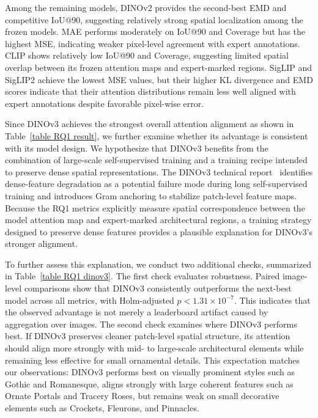 \documentclass[lineno,pdflatex,sn-mathphys-num]{sn-jnl}%
\theoremstyle{thmstyleone}%
\theoremstyle{thmstyletwo}%
\theoremstyle{thmstylethree}%
\begin{document}
Among the remaining models, DINOv2 provides the second-best EMD and competitive IoU@90, suggesting relatively strong spatial localization among the frozen models. MAE performs moderately on IoU@90 and Coverage but has the highest MSE, indicating weaker pixel-level agreement with expert annotations. CLIP shows relatively low IoU@90 and Coverage, suggesting limited spatial overlap between its frozen attention maps and expert-marked regions. SigLIP and SigLIP2 achieve the lowest MSE values, but their higher KL divergence and EMD scores indicate that their attention distributions remain less well aligned with expert annotations despite favorable pixel-wise error.

Since DINOv3 achieves the strongest overall attention alignment as shown in Table~\ref{table RQ1 result}, we further examine whether its advantage is consistent with its model design. We hypothesize that DINOv3 benefits from the combination of large-scale self-supervised training and a training recipe intended to preserve dense spatial representations. The DINOv3 technical report~\cite{Simeoni26DINOv3} identifies dense-feature degradation as a potential failure mode during long self-supervised training and introduces Gram anchoring to stabilize patch-level feature maps. Because the RQ1 metrics explicitly measure spatial correspondence between the model attention map and expert-marked architectural regions, a training strategy designed to preserve dense features provides a plausible explanation for DINOv3's stronger alignment.

To further assess this explanation, we conduct two additional checks, summarized in Table~\ref{table RQ1 dinov3}. The first check evaluates robustness. Paired image-level comparisons show that DINOv3 consistently outperforms the next-best model across all metrics, with Holm-adjusted $p < 1.31 \times 10^{-7}$. This indicates that the observed advantage is not merely a leaderboard artifact caused by aggregation over images. The second check examines where DINOv3 performs best. If DINOv3 preserves cleaner patch-level spatial structure, its attention should align more strongly with mid- to large-scale architectural elements while remaining less effective for small ornamental details. This expectation matches our observations: DINOv3 performs best on visually prominent styles such as Gothic and Romanesque, aligns strongly with large coherent features such as Ornate Portals and Tracery Roses, but remains weak on small decorative elements such as Crockets, Fleurons, and Pinnacles.
\end{document}
